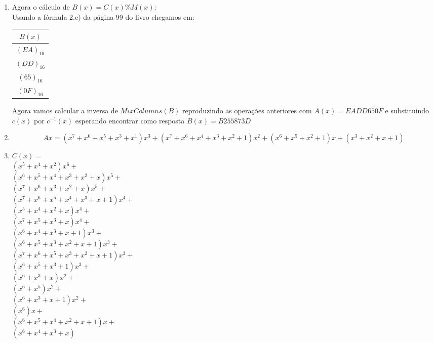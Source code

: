 \documentclass[12pt]{article}
\begin{document}
\begin{enumerate}
				Em hexadecimal temos:\\
				$C(x) = (CD)x^6 + (B2)x^5 + (FF)x^5 + (B2)x^4 + (55)x^4 + (92)x^4 + (7F)x^3 + (55)x^3 + (87)x^3 + (47)x^3 +
				(AA)x^2 + (87)x^2 + (3D)x^2 + (15)x + (3D)x + (7A)$\\
				\item
					Agora o cálculo de $B(x) = C(x) \% M(x)$:\\
					Usando a fórmula 2.c) da página 99 do livro chegamos em:\\
					\begin{table}[h]
						\centering
						\vspace{0.5cm}
						\begin{tabular}{c}
						$B(x)$\\
						\hline                               
							$(EA)_{16}$\\
							$(DD)_{16}$\\
							$(65)_{16}$\\
							$(0F)_{16}$\\
						\end{tabular}
					\end{table}
				\newpage
				Agora vamos calcular a inversa de $MixColumns(B)$ reproduzindo as operações anteriores com $A(x) = EADD650F$ e
				substituindo $c(x)$ por $c^{-1}(x)$ esperando encontrar como resposta $B(x) = B255873D$\\
				\item
					$$Ax = (x^7 + x^6 + x^5 + x^3 + x^1)x^3 + (x^7 + x^6 + x^4 + x^3 + x^2 + 1)x^2 + (x^6 + x^5 + x^2 + 1)x + (x^3 + 
					x^2 + x + 1)$$
				\item
					$C(x) = $\\
					$(x^5 + x^4 + x^2)x^6 +$\\
					$(x^6 + x^5 + x^4 + x^3 + x^2 + x)x^5 +$\\
					$(x^7 + x^6 + x^3 + x^2 + x)x^5 +$\\
					$(x^7 + x^6 + x^5 + x^4 + x^3 + x + 1)x^4 +$\\
					$(x^5 + x^4 + x^2 + x)x^4 +$\\
					$(x^7 + x^5 + x^3 + x)x^4 +$\\
					$(x^6 + x^4 + x^3 + x + 1)x^3 +$\\
					$(x^6 + x^5 + x^3 + x^2 + x + 1)x^3 +$\\
					$(x^7 + x^6 + x^5 + x^3 + x^2 + x + 1)x^3 +$\\
					$(x^6 + x^5 + x^3 + 1)x^3 +$\\
					$(x^6 + x^3 + x)x^2 +$\\
					$(x^6 + x^5)x^2 +$\\
					$(x^6 + x^3 + x + 1)x^2 +$\\
					$(x^6)x +$\\
					$(x^6 + x^5 + x^4 + x^2 + x + 1)x +$\\
					$(x^6 + x^4 + x^3 + x)$\\	
					

\end{enumerate}
\end{document}
